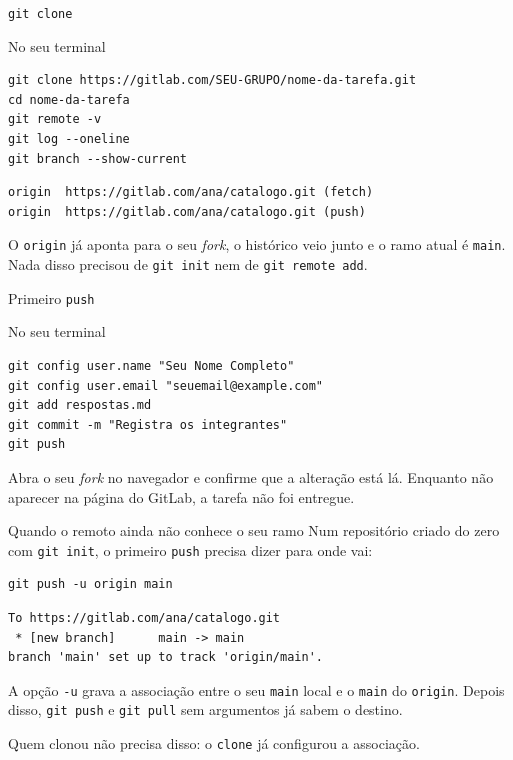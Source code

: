 \documentclass{beamer}
\newenvironment{noterminal}
  {\begin{exampleblock}{No seu terminal}}
  {\end{exampleblock}}
\begin{document}
\begin{frame}[fragile]{\texttt{git clone}}
  \begin{noterminal}
    \begin{verbatim}
git clone https://gitlab.com/SEU-GRUPO/nome-da-tarefa.git
cd nome-da-tarefa
git remote -v
git log --oneline
git branch --show-current
    \end{verbatim}
  \end{noterminal}

  \begin{verbatim}
origin	https://gitlab.com/ana/catalogo.git (fetch)
origin	https://gitlab.com/ana/catalogo.git (push)
  \end{verbatim}

  O \texttt{origin} já aponta para o seu \textit{fork}, o histórico veio junto e
  o ramo atual é \texttt{main}. Nada disso precisou de \texttt{git init} nem de
  \texttt{git remote add}.
\end{frame}

\begin{frame}[fragile]{Primeiro \texttt{push}}
  \begin{noterminal}
    \begin{verbatim}
git config user.name "Seu Nome Completo"
git config user.email "seuemail@example.com"
git add respostas.md
git commit -m "Registra os integrantes"
git push
    \end{verbatim}
  \end{noterminal}

  \vspace{0.3cm}
  \begin{alertblock}{}
    Abra o seu \textit{fork} no navegador e confirme que a alteração está lá.
    Enquanto não aparecer na página do GitLab, a tarefa não foi entregue.
  \end{alertblock}
\end{frame}

\begin{frame}[fragile]{Quando o remoto ainda não conhece o seu ramo}
  Num repositório criado do zero com \texttt{git init}, o primeiro \texttt{push}
  precisa dizer para onde vai:

  \begin{verbatim}
git push -u origin main
  \end{verbatim}

  \begin{verbatim}
To https://gitlab.com/ana/catalogo.git
 * [new branch]      main -> main
branch 'main' set up to track 'origin/main'.
  \end{verbatim}

  A opção \texttt{-u} grava a associação entre o seu \texttt{main} local e o
  \texttt{main} do \texttt{origin}. Depois disso, \texttt{git push} e
  \texttt{git pull} sem argumentos já sabem o destino.

  \vspace{0.2cm}
  \footnotesize Quem clonou não precisa disso: o \texttt{clone} já configurou a
  associação.
\end{frame}
\end{document}
